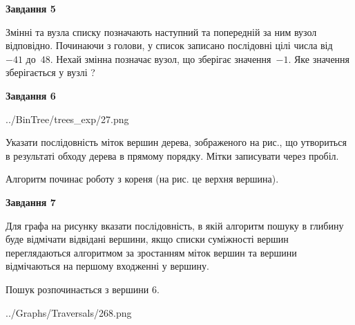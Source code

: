 \documentclass[12pt, ukrainian]{article}
\begin{document}
{\begin {large}
{\begin {center}\textbf{Завдання 5}\end {center}}\par
Змінні  та  вузла списку позначають наступний та попередній за ним вузол відповідно. Починаючи з голови, у список записано послідовні цілі числа від~$-41$ до~$48$. Нехай змінна  позначає вузол, що зберігає значення~$-1$.
Яке значення зберігається у вузлі  ?\par
\newpage

{\begin {center}\textbf{Завдання 6}\end {center}}\par

\begin{center}
	{../BinTree/trees_exp/27.png}
\end{center}
Указати послідовність міток вершин дерева, зображеного на рис., що утвориться в результаті обходу дерева в прямому порядку. Мітки записувати через пробіл.\par Алгоритм починає роботу з кореня (на рис. це верхня вершина).\par
\newpage

{\begin {center}\textbf{Завдання 7}\end {center}}\par
Для графа на рисунку вказати послідовність, в якій алгоритм пошуку в глибину буде відмічати відвідані вершини, якщо списки суміжності вершин переглядаються алгоритмом за зростанням міток вершин та вершини відмічаються на першому вход\-женні у вершину.\par
Пошук розпочинається з вершини 6.\par

\begin{center}
	{../Graphs/Traversals/268.png}
\end{center}\par
\newpage


\end{large}}
\end{document}
